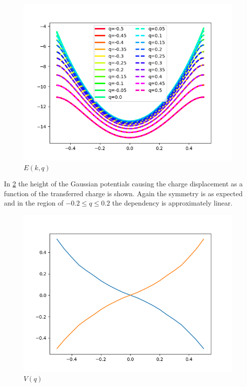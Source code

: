 \begin{figure}
	\centering
	\includegraphics[width = 12cm]{Images/Hydrogen/hydrogen_charged_bands}
	\caption{$E(k, q)$}
	\label{image_hydrogen_charged_bands}
\end{figure}

In \cref{image_hydrogen_charge_potential} the height of the Gaussian potentials causing the charge displacement as a function of the transferred charge is shown. Again the symmetry is as expected and in the region of $-0.2 \le q \le 0.2$ the dependency is approximately linear.

\begin{figure}
	\centering
	\includegraphics[width = 12cm]{Images/Hydrogen/hydrogen_charge_potential}
	\caption{$V(q)$}
	\label{image_hydrogen_charge_potential}
\end{figure}


